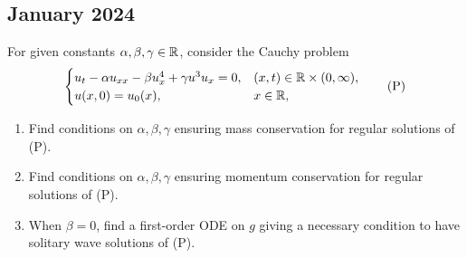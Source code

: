 \subsection{January 2024}
\begin{exercise}
    For given constants \(\alpha, \beta, \gamma \in \mathbb{R}\), consider the Cauchy problem
    \[
        \begin{cases}
            u_{t} - \alpha u_{xx} - \beta u_{x}^4 + \gamma u^3u_x = 0, & (x,t) \in \mathbb{R} \times (0, \infty), \\
            u(x,0) = u_0(x),                                           & x \in \mathbb{R},                        \\
        \end{cases}
        \tag*{(P)}
    \]
    \begin{enumerate}
        \item Find conditions on \(\alpha, \beta, \gamma\) ensuring mass conservation for
              regular solutions of (P).
        \item Find conditions on \(\alpha, \beta, \gamma\) ensuring momentum conservation for
              regular solutions of (P).
        \item When \(\beta = 0\), find a first-order ODE on \(g\) giving a necessary
              condition to have solitary wave solutions of (P).
    \end{enumerate}
\end{exercise}
